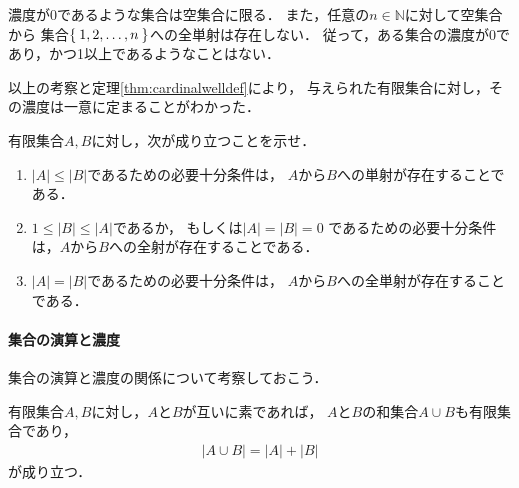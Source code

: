    濃度が0であるような集合は空集合に限る．
   また，任意の$n \in \mathbb{N}$に対して空集合から
   集合$\Set{ 1, 2, \ldots ,n}$への全単射は存在しない．
   従って，ある集合の濃度が0であり，かつ1以上であるようなことはない．
   
   以上の考察と定理\ref{thm:cardinalwelldef}により，
   与えられた有限集合に対し，その濃度は一意に定まることがわかった．

   \begin{que} \label{que:finitecardAB}
     有限集合$A,  B$に対し，次が成り立つことを示せ．
     \begin{enumerate}
       \item $\lvert A \rvert \leq \lvert B \rvert$であるための必要十分条件は，
         $A$から$B$への単射が存在することである．
       \item $1 \leq \lvert B \rvert \leq \lvert A \rvert$であるか，
         もしくは$\lvert A \rvert = \lvert B \rvert =0$
         であるための必要十分条件は，$A$から$B$への全射が存在することである．
       \item $\lvert A \rvert = \lvert B \rvert$であるための必要十分条件は，
         $A$から$B$への全単射が存在することである．
     \end{enumerate}
   \end{que}

  \paragraph{集合の演算と濃度}
   
   集合の演算と濃度の関係について考察しておこう．

   
   \begin{thm} \label{thm:unioncardfini}
     有限集合$A,  B$に対し，$A$と$B$が互いに素であれば，
     $A$と$B$の和集合$A \cup B$も有限集合であり，
     \begin{align}
       \lvert A \cup B \rvert = \lvert A \rvert + \lvert B \rvert 
       \label{eq:cupcardfini}
     \end{align}
     が成り立つ．
   \end{thm}

